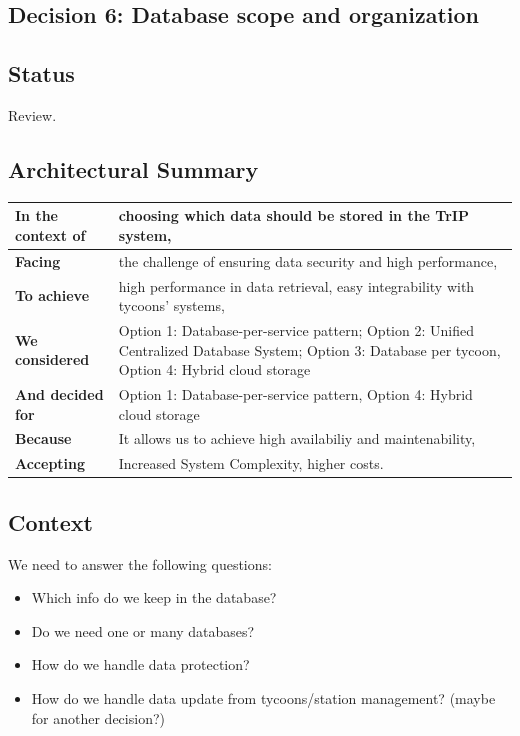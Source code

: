 \subsection{Decision 6: Database scope and organization}

\subsection*{Status}
Review.

\subsection*{Architectural Summary}
\begin{tabular}{|p{3.5cm}|p{10.5cm}|}
    \hline
    \textbf{In the context of} & choosing which data should be stored in the TrIP system, \\
    \hline
    \textbf{Facing} & the challenge of ensuring data security and high performance, \\
    \hline
    \textbf{To achieve} & high performance in data retrieval, easy integrability with tycoons' systems, \\
    \hline
    \textbf{We considered} & Option 1: Database-per-service pattern; Option 2: Unified Centralized Database System; Option 3: Database per tycoon, Option 4: Hybrid cloud storage\\
    \hline
    \textbf{And decided for} & Option 1: Database-per-service pattern, Option 4: Hybrid cloud storage \\
    \hline
    \textbf{Because} & It allows us to achieve high availabiliy and maintenability, \\
    \hline
    \textbf{Accepting} & Increased System Complexity, higher costs. \\
    \hline
\end{tabular}

\subsection*{Context}
We need to answer the following questions:
\begin{itemize}
\item Which info do we keep in the database? 
\item Do we need one or many databases?
\item How do we handle data protection?
\item How do we handle data update from tycoons/station management? (maybe for another decision?)
\end{itemize}


